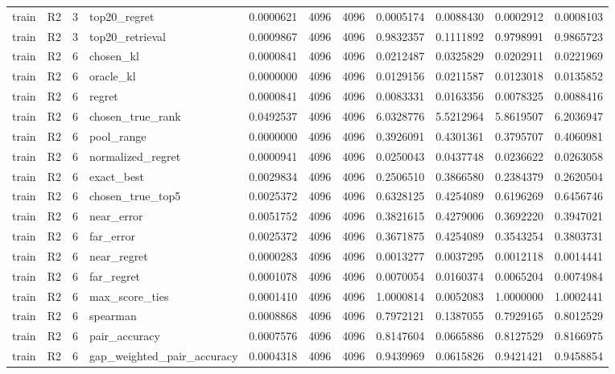 \begin{tabular}{llrlrrrrrrr}
train & R2 & 3 & top20_regret & 0.0000621 & 4096 & 4096 & 0.0005174 & 0.0088430 & 0.0002912 & 0.0008103 \\
train & R2 & 3 & top20_retrieval & 0.0009867 & 4096 & 4096 & 0.9832357 & 0.1111892 & 0.9798991 & 0.9865723 \\
train & R2 & 6 & chosen_kl & 0.0000841 & 4096 & 4096 & 0.0212487 & 0.0325829 & 0.0202911 & 0.0221969 \\
train & R2 & 6 & oracle_kl & 0.0000000 & 4096 & 4096 & 0.0129156 & 0.0211587 & 0.0123018 & 0.0135852 \\
train & R2 & 6 & regret & 0.0000841 & 4096 & 4096 & 0.0083331 & 0.0163356 & 0.0078325 & 0.0088416 \\
train & R2 & 6 & chosen_true_rank & 0.0492537 & 4096 & 4096 & 6.0328776 & 5.5212964 & 5.8619507 & 6.2036947 \\
train & R2 & 6 & pool_range & 0.0000000 & 4096 & 4096 & 0.3926091 & 0.4301361 & 0.3795707 & 0.4060981 \\
train & R2 & 6 & normalized_regret & 0.0000941 & 4096 & 4096 & 0.0250043 & 0.0437748 & 0.0236622 & 0.0263058 \\
train & R2 & 6 & exact_best & 0.0029834 & 4096 & 4096 & 0.2506510 & 0.3866580 & 0.2384379 & 0.2620504 \\
train & R2 & 6 & chosen_true_top5 & 0.0025372 & 4096 & 4096 & 0.6328125 & 0.4254089 & 0.6196269 & 0.6456746 \\
train & R2 & 6 & near_error & 0.0051752 & 4096 & 4096 & 0.3821615 & 0.4279006 & 0.3692220 & 0.3947021 \\
train & R2 & 6 & far_error & 0.0025372 & 4096 & 4096 & 0.3671875 & 0.4254089 & 0.3543254 & 0.3803731 \\
train & R2 & 6 & near_regret & 0.0000283 & 4096 & 4096 & 0.0013277 & 0.0037295 & 0.0012118 & 0.0014441 \\
train & R2 & 6 & far_regret & 0.0001078 & 4096 & 4096 & 0.0070054 & 0.0160374 & 0.0065204 & 0.0074984 \\
train & R2 & 6 & max_score_ties & 0.0001410 & 4096 & 4096 & 1.0000814 & 0.0052083 & 1.0000000 & 1.0002441 \\
train & R2 & 6 & spearman & 0.0008868 & 4096 & 4096 & 0.7972121 & 0.1387055 & 0.7929165 & 0.8012529 \\
train & R2 & 6 & pair_accuracy & 0.0007576 & 4096 & 4096 & 0.8147604 & 0.0665886 & 0.8127529 & 0.8166975 \\
train & R2 & 6 & gap_weighted_pair_accuracy & 0.0004318 & 4096 & 4096 & 0.9439969 & 0.0615826 & 0.9421421 & 0.9458854 \\

\end{tabular}
